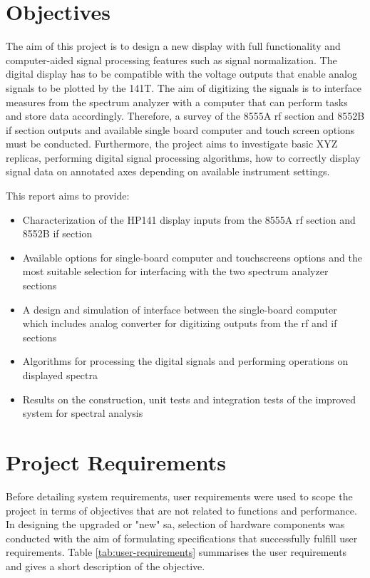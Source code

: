 \documentclass[class=report,11pt,crop=false]{standalone}
\begin{document}
\section{Objectives}
The aim of this project is to design a new display with full functionality and computer-aided signal processing features such as signal normalization. The digital display has to be compatible with the voltage outputs that enable analog signals to be plotted by the 141T. The aim of digitizing the signals is to interface measures from the spectrum analyzer with a computer that can perform tasks and store data accordingly. Therefore, a survey of the 8555A \acrshort{rf} section and 8552B \acrshort{if} section outputs and available single board computer and touch screen options must be conducted. Furthermore, the project aims to investigate basic XYZ replicas, performing digital signal processing algorithms, how to correctly display signal data on annotated axes depending on available instrument settings.

This report aims to provide:
\begin{itemize}
	\item 
	Characterization of the HP141 display inputs from the 8555A \acrshort{rf} section and 8552B \acrshort{if} section
	\item 
	Available options for single-board computer and touchscreens options and the most suitable selection for interfacing with the two spectrum analyzer sections
	\item 
	A design and simulation of interface between the single-board computer which includes analog converter for digitizing outputs from the \acrshort{rf} and \acrshort{if} sections
	\item 
	Algorithms for processing the digital signals and performing operations on displayed spectra
	\item 
	Results on the construction, unit tests and integration tests of the improved system for spectral analysis	
\end{itemize}

\section{Project Requirements}

Before detailing system requirements, user requirements were used to scope the project in terms of objectives that are not related to functions and performance. In designing the upgraded or "new" \acrshort{sa}, selection of hardware components was conducted with the aim of formulating specifications that successfully fulfill user requirements. Table \ref{tab:user-requirements} summarises the user requirements and gives a short description of the objective.
\end{document}
